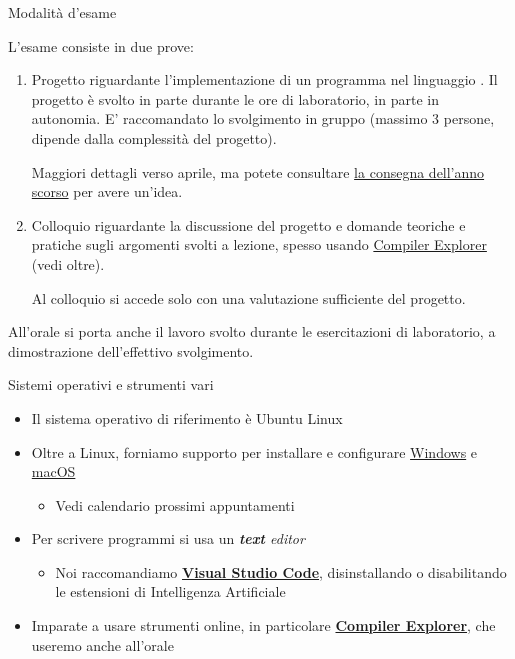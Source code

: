 \begin{frame}{Modalità d'esame}

  L'esame consiste in due prove:

  \begin{enumerate}

  \item Progetto riguardante l'implementazione di un programma nel linguaggio
    \Cpp{}. Il progetto è svolto in parte durante le ore di laboratorio, in
    parte in autonomia. E' raccomandato lo svolgimento in gruppo (massimo 3
    persone, dipende dalla complessità del progetto).

    Maggiori dettagli verso aprile, ma potete consultare
    \href{https://github.com/Programmazione-per-la-Fisica/progetto2024}{la
      consegna dell'anno scorso} per avere un'idea.

  \item Colloquio riguardante la discussione del progetto e domande
    teoriche e pratiche sugli argomenti svolti a lezione, spesso
    usando \href{https://godbolt.org/}{Compiler Explorer} (vedi oltre).

    Al colloquio si accede solo con una valutazione sufficiente del progetto.

  \end{enumerate}

  All'orale si porta anche il lavoro svolto durante le esercitazioni di
  laboratorio, a dimostrazione dell'effettivo svolgimento.

\end{frame}

\begin{frame}{Sistemi operativi e strumenti vari}
  \begin{itemize}[<+->]
  \item Il sistema operativo di riferimento è Ubuntu Linux
  \item Oltre a Linux, forniamo supporto per installare e configurare
    \href{https://github.com/Programmazione-per-la-Fisica/howto/blob/main/other-OSes/WSLGuide.md}{Windows}
    e
    \href{https://github.com/Programmazione-per-la-Fisica/howto/blob/main/other-OSes/macOSGuide.md}{macOS}
      \begin{itemize}[<.->]
      \item Vedi calendario prossimi appuntamenti
      \end{itemize}
  \item Per scrivere programmi si usa un \textit{\textbf{text} editor}
    \begin{itemize}[<.->]
    \item Noi raccomandiamo \href{https://code.visualstudio.com/}{\textbf{Visual
          Studio Code}}, disinstallando o disabilitando le estensioni di
          Intelligenza Artificiale
    \end{itemize}
  \item Imparate a usare strumenti online, in particolare
    \href{https://godbolt.org/}{\textbf{Compiler Explorer}}, che
    useremo anche all'orale
  \end{itemize}

\end{frame}


